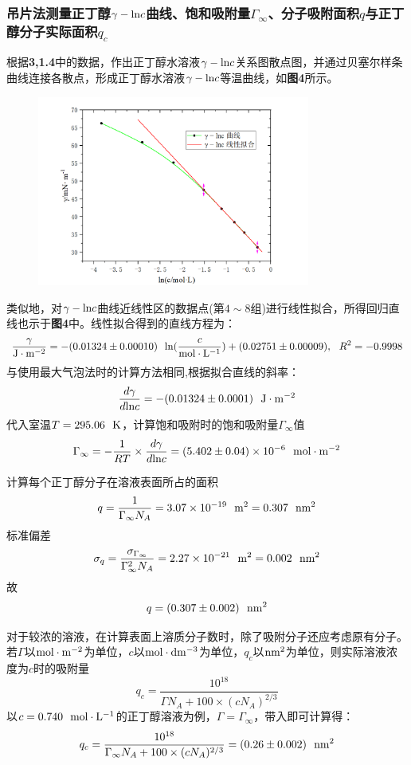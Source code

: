 \documentclass[12pt]{article}
\begin{document}
			\subsubsection{吊片法测量正丁醇$\gamma-{\rm ln}c$曲线、饱和吸附量$\Gamma_{\infty}$、分子吸附面积$q$与正丁醇分子实际面积$q_{c}$}
			根据\textbf{3,1.4}中的数据，作出正丁醇水溶液$\gamma-{\rm ln}c$关系图散点图，并通过贝塞尔样条曲线连接各散点，形成正丁醇水溶液$\gamma-{\rm ln}c$等温曲线，如\textbf{图4}所示。
			\begin{figure}[h]
				\centering
				\includegraphics[width=0.80\textwidth]{4.png}
			\end{figure}
			\par
			类似地，对$\gamma-{\rm ln}c$曲线近线性区的数据点(第$4\sim 8$组)进行线性拟合，所得回归直线也示于\textbf{图4}中。线性拟合得到的直线方程为：
			$$
			\frac{\gamma}{{\rm J\cdot m^{-2}}}=-(0.01324 \pm 0.00010 )\ \ {\rm ln}(\frac{c}{{\rm mol\cdot L^{-1}}})+(0.02751\pm 0.00009),\ \ R^{2}=-0.9998
			$$
			与使用最大气泡法时的计算方法相同,根据拟合直线的斜率：
			$$
			\frac{d\gamma}{d{\rm ln}c}=-(0.01324\pm 0.0001)\ \ {\rm J\cdot m^{-2}}
			$$
			代入室温$T=295.06\ \ {\rm K}$，计算饱和吸附时的饱和吸附量$\Gamma_{\infty}$值
			$$
			\Gamma_{\infty}=-\frac{1}{RT}\times\frac{d\gamma}{d{\rm ln}c}=(5.402\pm 0.04)\times10^{-6}\ \ {\rm mol\cdot m^{-2}}
			$$
			\par 
			计算每个正丁醇分子在溶液表面所占的面积
			$$
			q=\frac{1}{\Gamma_{\infty}N_{A}}=3.07\times10^{-19}\ \ {\rm m^2}=0.307\ \ {\rm nm^{2}}
			$$
			标准偏差
			$$
			\sigma_{q}=\frac{\sigma_{\Gamma_{\infty}}}{\Gamma^{2}_{\infty} N_{A}}=2.27\times10^{-21}\ \ {\rm m^{2}}=0.002\ \ {\rm nm^{2}}
			$$
			故
			$$
			q=(0.307\pm 0.002)\ \ {\rm nm^{2}}
			$$
			\par 
			对于较浓的溶液，在计算表面上溶质分子数时，除了吸附分子还应考虑原有分子。若$\Gamma$以$\rm mol\cdot m^{-2}$为单位，$c$以$\rm mol\cdot dm^{-3}$为单位，$q_{c}$以$\rm nm^{2}$为单位，则实际溶液浓度为$c$时的吸附量
			$$
			q_{c}=\frac{10^{18}}{\Gamma N_{A}+100\times(cN_{A})^{2/3}}
			$$
			以$c=0.740\ \ {\rm mol\cdot L^{-1}}$的正丁醇溶液为例，$\Gamma=\Gamma_{\infty}$，带入即可计算得：
			$$
			q_{c}=\frac{10^{18}}{\Gamma_{\infty} N_{A}+100\times(cN_{A})^{2/3}}=(0.26\pm 0.002)\ \ {\rm nm^{2}}
			$$
\end{document}
